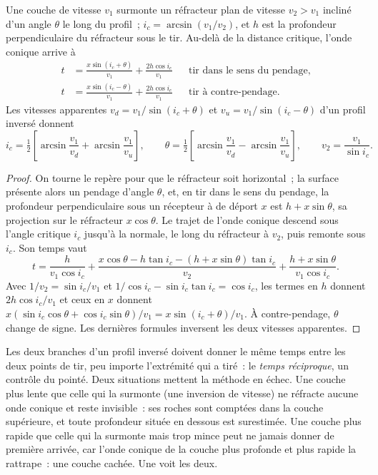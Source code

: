 \begin{theorem}\label{thm:b3:exploration-seismology:dipping}
Une couche de vitesse $v_1$ surmonte un réfracteur plan de vitesse $v_2 > v_1$ incliné
d'un angle $\theta$ le long du profil~; $i_c = \arcsin(v_1/v_2)$, et $h$ est la
profondeur perpendiculaire du réfracteur sous le tir. Au-delà de la
distance critique, l'onde conique arrive à
\begin{align*}
  t &= \frac{x\sin(i_c + \theta)}{v_1} + \frac{2h\cos i_c}{v_1}
  &&\text{tir dans le sens du pendage},\\
  t &= \frac{x\sin(i_c - \theta)}{v_1} + \frac{2h\cos i_c}{v_1}
  &&\text{tir à contre-pendage}.
\end{align*}
Les vitesses apparentes $v_d = v_1/\sin(i_c + \theta)$ et
$v_u = v_1/\sin(i_c - \theta)$ d'un profil inversé donnent
\[
  i_c = \tfrac12\left[\arcsin\frac{v_1}{v_d} + \arcsin\frac{v_1}{v_u}\right],\qquad
  \theta = \tfrac12\left[\arcsin\frac{v_1}{v_d} - \arcsin\frac{v_1}{v_u}\right],
  \qquad v_2 = \frac{v_1}{\sin i_c} .
\]
\end{theorem}

\begin{proof}
On tourne le repère pour que le réfracteur soit horizontal~; la surface présente alors un pendage
d'angle $\theta$, et, en tir dans le sens du pendage, la profondeur perpendiculaire sous un récepteur à
de déport $x$ est $h + x\sin\theta$, sa projection sur le réfracteur
$x\cos\theta$. Le trajet de l'onde conique descend sous l'angle critique $i_c$ jusqu'à la
normale, le long du réfracteur à $v_2$, puis remonte sous $i_c$. Son temps vaut
\[
  t = \frac{h}{v_1\cos i_c} + \frac{x\cos\theta - h\tan i_c - (h + x\sin\theta)\tan i_c}{v_2}
  + \frac{h + x\sin\theta}{v_1\cos i_c}.
\]
Avec $1/v_2 = \sin i_c/v_1$ et $1/\cos i_c - \sin i_c\tan i_c = \cos i_c$,
les termes en $h$ donnent $2h\cos i_c/v_1$ et ceux en $x$ donnent
$x(\sin i_c\cos\theta + \cos i_c\sin\theta)/v_1 = x\sin(i_c + \theta)/v_1$.
À contre-pendage, $\theta$ change de signe. Les dernières formules inversent les deux vitesses
apparentes.
\end{proof}

Les deux branches d'un profil inversé doivent donner le même temps entre les deux
points de tir, peu importe l'extrémité qui a tiré~: le \emph{temps réciproque}, un contrôle du
pointé. Deux situations mettent la méthode en échec. Une couche plus lente que celle qui la surmonte
(une inversion de vitesse) ne réfracte aucune onde conique et reste invisible~: ses roches sont
comptées dans la couche supérieure, et toute profondeur située en dessous est surestimée. Une couche
plus rapide que celle qui la surmonte mais trop mince peut ne jamais donner de première arrivée, car
l'onde conique de la couche plus profonde et plus rapide la rattrape~: une couche cachée. Une
 voit les deux.

